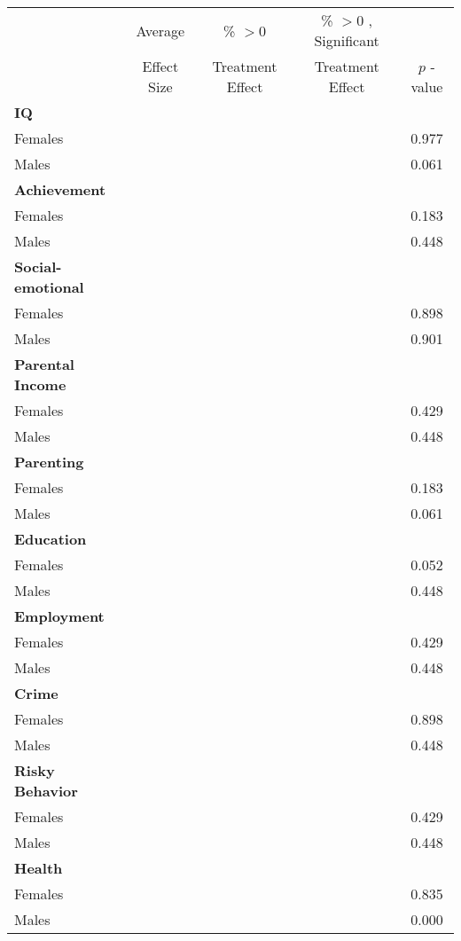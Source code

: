 \begin{tabular}{l c c c c}
\toprule
 & Average & \% $ >0 $ & \% $ >0 $ , Significant & \citet{Rosenbaum_2005_Distribution_JRSS} \\
 & Effect Size & Treatment Effect & Treatment Effect & $ p $ -value \\
\midrule
\textbf{IQ} & & & & \\
\quad Females &   &  &  &     0.977 \\
\quad Males &   &  &  &     0.061 \\
\midrule
\textbf{Achievement} & & & & \\
\quad Females &   &  &  &     0.183 \\
\quad Males &   &  &  &     0.448 \\
\midrule
\textbf{Social-emotional} & & & & \\
\quad Females &   &  &  &     0.898 \\
\quad Males &   &  &  &     0.901 \\
\midrule
\textbf{Parental Income} & & & & \\
\quad Females &   &  &  &     0.429 \\
\quad Males &   &  &  &     0.448 \\
\midrule
\textbf{Parenting} & & & & \\
\quad Females &   &  &  &     0.183 \\
\quad Males &   &  &  &     0.061 \\
\midrule
\textbf{Education} & & & & \\
\quad Females &   &  &  &     0.052 \\
\quad Males &   &  &  &     0.448 \\
\midrule
\textbf{Employment} & & & & \\
\quad Females &   &  &  &     0.429 \\
\quad Males &   &  &  &     0.448 \\
\midrule
\textbf{Crime} & & & & \\
\quad Females &   &  &  &     0.898 \\
\quad Males &   &  &  &     0.448 \\
\midrule
\textbf{Risky Behavior} & & & & \\
\quad Females &   &  &  &     0.429 \\
\quad Males &   &  &  &     0.448 \\
\midrule
\textbf{Health} & & & & \\
\quad Females &   &  &  &     0.835 \\
\quad Males &   &  &  &     0.000 \\
\bottomrule
\end{tabular}
